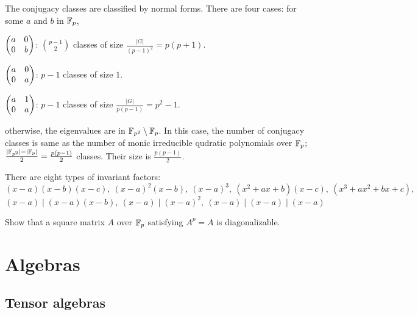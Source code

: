 \documentclass{../../large}
\begin{document}
\begin{prb}
The conjugacy classes are classified by normal forms.
There are four cases: for some $a$ and $b$ in $\mathbb{F}_p$,
\begin{parts}
\item $\begin{pmatrix}a&0\\0&b\end{pmatrix}$: $\binom{p-1}2$ classes of size $\frac{|G|}{(p-1)^2}=p(p+1)$.
\item $\begin{pmatrix}a&0\\0&a\end{pmatrix}$: $p-1$ classes of size $1$.
\item $\begin{pmatrix}a&1\\0&a\end{pmatrix}$: $p-1$ classes of size $\frac{|G|}{p(p-1)}=p^2-1$.
\item otherwise, the eigenvalues are in $\mathbb{F}_{p^2}\setminus\mathbb{F}_p$.
In this case, the number of conjugacy classes is same as the number of monic irreducible qudratic polynomials over $\mathbb{F}_p$; $\frac{|\mathbb{F}_{p^2}|-|\mathbb{F}_p|}2=\frac{p(p-1)}2$ classes.
Their size is $\frac{p(p-1)}2$.
\end{parts}
\end{prb}

\begin{prb}
There are eight types of invariant factors:
\[(x-a)(x-b)(x-c),\ (x-a)^2(x-b),\ (x-a)^3,\ (x^2+ax+b)(x-c),\ (x^3+ax^2+bx+c),\]
\[(x-a)\mid(x-a)(x-b),\ (x-a)\mid(x-a)^2,\ (x-a)\mid(x-a)\mid(x-a)\]
\end{prb}

Show that a square matrix $A$ over $\mathbb{F}_p$ satisfying $A^p=A$ is diagonalizable.














\part{Algebras}

\chapter{Tensor algebras}
\end{document}
